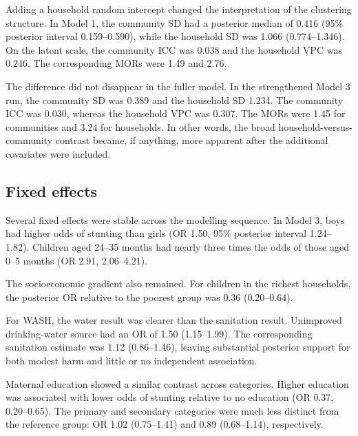 \documentclass[11pt]{article}
\begin{document}
Adding a household random intercept changed the interpretation of the clustering structure. In Model 1, the community SD had a posterior median of 0.416 (95\% posterior interval 0.159--0.590), while the household SD was 1.066 (0.774--1.346). On the latent scale, the community ICC was 0.038 and the household VPC was 0.246. The corresponding MORs were 1.49 and 2.76.

The difference did not disappear in the fuller model. In the strengthened Model 3 run, the community SD was 0.389 and the household SD 1.234. The community ICC was 0.030, whereas the household VPC was 0.307. The MORs were 1.45 for communities and 3.24 for households. In other words, the broad household-versus-community contrast became, if anything, more apparent after the additional covariates were included.

\subsection{Fixed effects}

Several fixed effects were stable across the modelling sequence. In Model 3, boys had higher odds of stunting than girls (OR 1.50, 95\% posterior interval 1.24--1.82). Children aged 24--35 months had nearly three times the odds of those aged 0--5 months (OR 2.91, 2.06--4.21).

The socioeconomic gradient also remained. For children in the richest households, the posterior OR relative to the poorest group was 0.36 (0.20--0.64).

For WASH, the water result was clearer than the sanitation result. Unimproved drinking-water source had an OR of 1.50 (1.15--1.99). The corresponding sanitation estimate was 1.12 (0.86--1.46), leaving substantial posterior support for both modest harm and little or no independent association.

Maternal education showed a similar contrast across categories. Higher education was associated with lower odds of stunting relative to no education (OR 0.37, 0.20--0.65). The primary and secondary categories were much less distinct from the reference group: OR 1.02 (0.75--1.41) and 0.89 (0.68--1.14), respectively.
\end{document}
